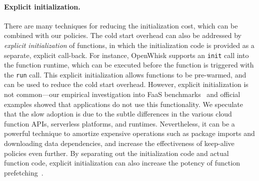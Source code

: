 \paragraph{Explicit initialization.}
There are many techniques for reducing the initialization cost, which can be combined with our policies. 
The cold start overhead can also be addressed by \emph{explicit initialization} of functions, in which the initialization code is provided as a separate, explicit call-back. 
For instance, OpenWhisk supports an \texttt{init} call into the function runtime, which can be executed before the function is triggered with the \texttt{run} call. 
This explicit initialization allows functions to be pre-warmed, and can be used to reduce the cold start overhead.  
However, explicit initialization is not common---our empirical investigation into FaaS benchmarks~\cite{kim_functionbench_2019} and official examples showed that applications do not use this functionality. 
We speculate that the slow adoption is due to the subtle differences in the various cloud function APIs, serverless platforms, and runtimes. 
Nevertheless, it can be a powerful technique to amortize expensive operations such as package imports and downloading data dependencies, and increase the effectiveness of keep-alive policies even further.
By separating out the initialization code and actual function code, explicit initialization can also increase the potency of function prefetching~\cite{shahrad_serverless_2020}. 


